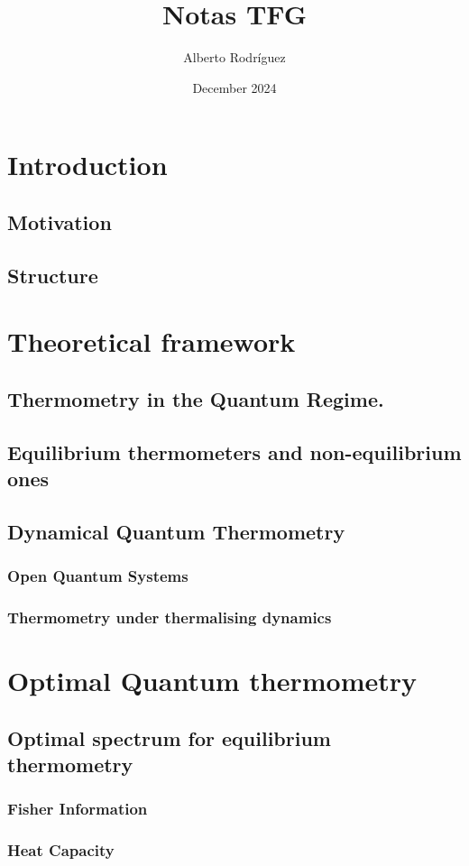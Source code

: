\documentclass{article}
\title{Notas TFG}
\author{Alberto Rodríguez}
\date{December 2024}
\begin{document}
\tableofcontents
\newpage

\section{Introduction}
\subsection{Motivation}
\subsection{Structure}

\newpage
\section{Theoretical framework}
\subsection{Thermometry in the Quantum Regime.}
\subsection{Equilibrium thermometers and non-equilibrium ones}
\subsection{Dynamical Quantum Thermometry}
\subsubsection{Open Quantum Systems}
\subsubsection{Thermometry under thermalising dynamics}

\newpage
\section{Optimal Quantum thermometry}
\subsection{Optimal spectrum for equilibrium thermometry}
\subsubsection{Fisher Information}
\subsubsection{Heat Capacity}
\end{document}
